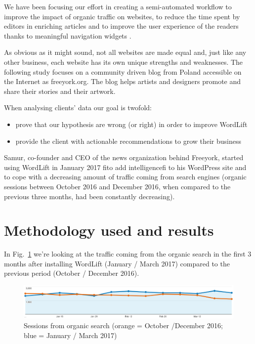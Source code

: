 \documentclass[runningheads,a4paper]{llncs}
\makeatletter
\def\maxwidth#1{\ifdim\Gin@nat@width>#1 #1\else\Gin@nat@width\fi}
\makeatother
\begin{document}
We have been focusing our effort in creating a semi-automated
 workflow to improve the impact of organic traffic on websites, to
 reduce the time spent by editors in enriching articles and to improve
 the user experience of the readers thanks to meaningful navigation
 widgets  \cite{__RefHeading__456_683783752}.

As obvious as it might sound, not all websites are made equal
 and, just like any other business, each website has its own unique
 strengths and weaknesses. The following study focuses on a community driven blog from Poland accessible on the Internet as freeyork.org. The blog helps artists and designers promote and share
 their stories and their artwork.

When analysing clients' data our goal is twofold:
\begin{itemize}
\item prove that our hypothesis are wrong (or right) in order to
 improve WordLift
\item provide the client with actionable recommendations to
 grow their business
\end{itemize}

Samur, co-founder and CEO of the news organization behind Freeyork, started using WordLift in January 2017 fito add intelligencefi to
 his WordPress site and to cope with a decreasing amount of traffic
 coming from search engines (organic sessions between October
 2016 and December 2016, when compared to the previous three
 months, had been constantly decreasing).

\section{Methodology used and results}

In Fig.~\ref{refIllustration0} we're looking at the traffic coming from the organic
 search in the first 3 months after installing WordLift (January /
 March 2017) compared to the previous period (October / December
2016).
\begin{figure}[h!]
\centering
\includegraphics[width=\maxwidth{\textwidth}]{img/10000201000003CF0000009BC0D1F65B.png}
\cprotect\caption{Sessions from organic search (orange = October /December 2016; blue = January / March 2017)}
\label{refIllustration0}
\end{figure}
\end{document}
